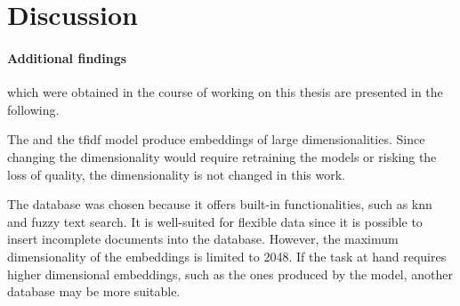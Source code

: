 \section{Discussion}\label{sec:discussion}











\paragraph{Additional findings} which were obtained in the course of working on this thesis  
are presented in the following.

The \infersent{} and the \ac{tfidf} model produce embeddings of large dimensionalities.
Since changing the dimensionality would require retraining the models 
or risking the loss of quality, the dimensionality is not changed in this work.

The database \databaseName{} was chosen because it offers built-in functionalities,
such as \ac{knn} and fuzzy text search.
It is well-suited for flexible data since it is possible to insert 
incomplete documents into the database.
However, the maximum dimensionality of the embeddings is limited to 2048.
If the task at hand requires higher dimensional embeddings, such as the ones produced by the \infersent{} model, 
another database may be more suitable.